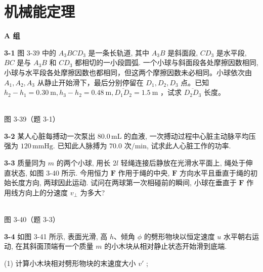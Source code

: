 \chapter{机械能定理}
\begin{center}\textbf{A 组}\end{center}

\textbf{3-1} 图 3-39 中的 $A_{3}BCD_{3}$ 是一条长轨道, 其中 $A_{3}B$ 是斜面段, $CD_{3}$ 是水平段, $BC$ 是与 $A_{3}B$ 和 $CD_{3}$ 都相切的一小段圆弧. 一个小球与斜面段各处摩擦因数相同, 小球与水平段各处摩擦因数也都相同，但这两个摩擦因数未必相同。小球依次由 $A_{1}, A_{2}, A_{3}$ 从静止开始滑下，最后分别停留在 $D_{1}, D_{2}, D_{3}$ 点。已知 $h_{2} - h_{1} = 0.30 \mathrm{~m}, h_{3} - h_{2} = 0.48 \mathrm{~m}, \overline{D_{1} D_{2}} = 1.5 \mathrm{~m}$ ，试求 $\overline{D_{2} D_{3}}$ 长度。

\begin{center}
\resizebox{0.50\textwidth}{!}{}\\[4pt]
{\small 图 3-39（题 3-1）}
\end{center}

\newpage

\textbf{3-2} 某人心脏每搏动一次泵出 $80.0\,\mathrm{mL}$ 的血液, 一次搏动过程中心脏主动脉平均压强为 $120\,\mathrm{mmHg}$. 已知此人脉搏为 $70.0$ 次$/\mathrm{min}$, 试求此人心脏工作的功率.

\newpage

\textbf{3-3} 质量同为 $m$ 的两个小球, 用长 $2l$ 轻绳连接后静放在光滑水平面上, 绳处于伸直状态, 如图 3-40 所示. 今用恒力 $\pmb{F}$ 作用于绳的中央, $\pmb{F}$ 方向水平且垂直于绳的初始长度方向, 两球因此运动. 试问在两球第一次相碰前的瞬间, 小球在垂直于 $\pmb{F}$ 作用线方向上的分速度 $v_{\perp}$ 为多大?

\begin{center}
\resizebox{0.21\textwidth}{!}{}\\[4pt]
{\small 图 3-40（题 3-3）}
\end{center}

\newpage

\textbf{3-4} 如图 3-41 所示, 表面光滑, 高 $h$、倾角 $\phi$ 的劈形物块以恒定速度 $u$ 水平朝右运动, 在其斜面顶端有一个质量 $m$ 的小木块从相对静止状态开始滑到底端.

(1) 计算小木块相对劈形物块的末速度大小 $v'$ ;

